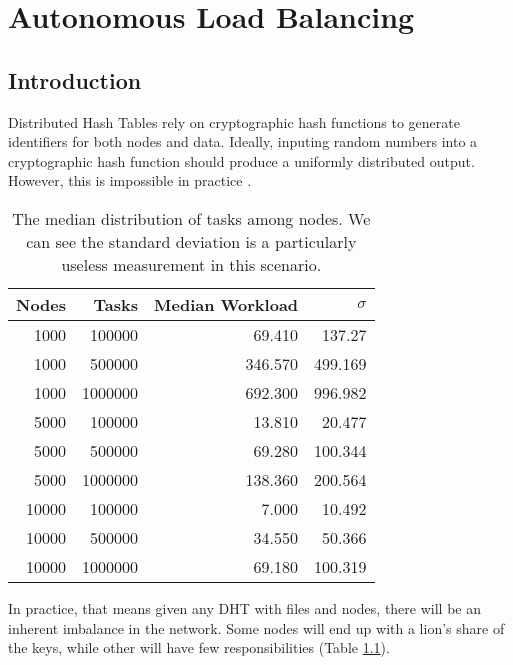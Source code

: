 \chapter{Autonomous Load Balancing}
\label{chapter:auto-balance}





\section{Introduction}
Distributed Hash Tables rely on cryptographic hash functions to generate identifiers for both nodes and data.
Ideally, inputing random numbers into a cryptographic hash function should produce a uniformly distributed output.
However, this is impossible in practice \cite{hash-outputs} \cite{thomsen2005cryptographic}.


\begin{table}
	\centering
	\caption{The median distribution of tasks among nodes.  We can see the standard deviation is a particularly useless measurement in this scenario.}
	\begin{tabular}{r r r r}
		Nodes & Tasks & Median Workload & $\sigma$ \\ \hline
		1000  & 100000 & 69.410  & 137.27  \\
		
		1000 & 500000 & 346.570  &  499.169 \\
		1000 &1000000 & 692.300  &  996.982 \\
		
		5000 & 100000  & 13.810 & 20.477 \\ 
		5000 & 500000  & 69.280 & 100.344 \\ 
		5000 & 1000000 &138.360 & 200.564 \\ 
		
		10000 & 100000 & 7.000   &  10.492 \\
		10000 & 500000 & 34.550  &   50.366 \\
		10000 & 1000000& 69.180  &  100.319 \\
	\end{tabular}
	\label{tab:medianLoads}
\end{table}




In practice, that means given any DHT with files and nodes, there will be an inherent imbalance in the network.
Some nodes will end up with a lion's share of the keys, while other will have few responsibilities (Table \ref{tab:medianLoads}).

